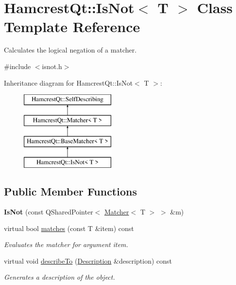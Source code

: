 \hypertarget{class_hamcrest_qt_1_1_is_not}{\section{Hamcrest\-Qt\-:\-:Is\-Not$<$ T $>$ Class Template Reference}
\label{class_hamcrest_qt_1_1_is_not}
}


Calculates the logical negation of a matcher.  




{\ttfamily \#include $<$isnot.\-h$>$}

Inheritance diagram for Hamcrest\-Qt\-:\-:Is\-Not$<$ T $>$\-:\begin{figure}[H]
\begin{center}
\leavevmode
\includegraphics[height=4.000000cm]{class_hamcrest_qt_1_1_is_not}
\end{center}
\end{figure}
\subsection*{Public Member Functions}
\begin{DoxyCompactItemize}
\item 
\hypertarget{class_hamcrest_qt_1_1_is_not_ac31d53bbc1b631f7fa00c5c09568730f}{{\bfseries Is\-Not} (const Q\-Shared\-Pointer$<$ \hyperlink{class_hamcrest_qt_1_1_matcher}{Matcher}$<$ T $>$ $>$ \&m)}\label{class_hamcrest_qt_1_1_is_not_ac31d53bbc1b631f7fa00c5c09568730f}

\item 
virtual bool \hyperlink{class_hamcrest_qt_1_1_is_not_a37c8d69373e96e12dc8937d241cfde9f}{matches} (const T \&item) const 
\begin{DoxyCompactList}\small\item\em Evaluates the matcher for argument {\itshape item}. \end{DoxyCompactList}\item 
virtual void \hyperlink{class_hamcrest_qt_1_1_is_not_a0fe1623440286dcacb586b531e94384f}{describe\-To} (\hyperlink{class_hamcrest_qt_1_1_description}{Description} \&description) const 
\begin{DoxyCompactList}\small\item\em Generates a description of the object. \end{DoxyCompactList}\end{DoxyCompactItemize}


